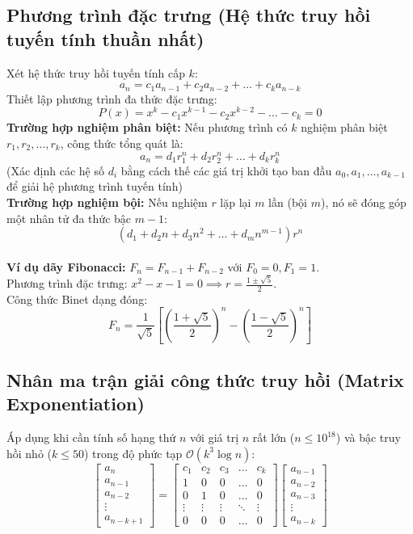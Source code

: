 \subsection{Phương trình đặc trưng (Hệ thức truy hồi tuyến tính thuần nhất)}
Xét hệ thức truy hồi tuyến tính cấp $k$:
\[ a_n = c_1 a_{n-1} + c_2 a_{n-2} + \dots + c_k a_{n-k} \]
Thiết lập phương trình đa thức đặc trưng:
\[ P(x) = x^k - c_1 x^{k-1} - c_2 x^{k-2} - \dots - c_k = 0 \]
\textbf{Trường hợp nghiệm phân biệt:} Nếu phương trình có $k$ nghiệm phân biệt $r_1, r_2, \dots, r_k$, công thức tổng quát là:
\[ a_n = d_1 r_1^n + d_2 r_2^n + \dots + d_k r_k^n \]
(Xác định các hệ số $d_i$ bằng cách thế các giá trị khởi tạo ban đầu $a_0, a_1, \dots, a_{k-1}$ để giải hệ phương trình tuyến tính) \\
\textbf{Trường hợp nghiệm bội:} Nếu nghiệm $r$ lặp lại $m$ lần (bội $m$), nó sẽ đóng góp một nhân tử đa thức bậc $m-1$:
\[ (d_1 + d_2 n + d_3 n^2 + \dots + d_m n^{m-1}) r^n \] \\
\textbf{Ví dụ dãy Fibonacci:} $F_n = F_{n-1} + F_{n-2}$ với $F_0 = 0, F_1 = 1$. \\
Phương trình đặc trưng: $x^2 - x - 1 = 0 \implies r = \frac{1 \pm \sqrt{5}}{2}$. \\
Công thức Binet dạng đóng:
\[ F_n = \frac{1}{\sqrt{5}} \left[ \left(\frac{1+\sqrt{5}}{2}\right)^n - \left(\frac{1-\sqrt{5}}{2}\right)^n \right] \]

\subsection{Nhân ma trận giải công thức truy hồi (Matrix Exponentiation)}
Áp dụng khi cần tính số hạng thứ $n$ với giá trị $n$ rất lớn ($n \le 10^{18}$) và bậc truy hồi nhỏ ($k \le 50$) trong độ phức tạp $\mathcal{O}(k^3 \log n)$:
\[
\begin{bmatrix} a_n \\ a_{n-1} \\ a_{n-2} \\ \vdots \\ a_{n-k+1} \end{bmatrix}
=
\begin{bmatrix}
c_1 & c_2 & c_3 & \dots & c_k \\
1   & 0   & 0   & \dots & 0   \\
0   & 1   & 0   & \dots & 0   \\
\vdots & \vdots & \vdots & \ddots & \vdots \\
0   & 0   & 0   & \dots & 0
\end{bmatrix}
\begin{bmatrix} a_{n-1} \\ a_{n-2} \\ a_{n-3} \\ \vdots \\ a_{n-k} \end{bmatrix}
\]

